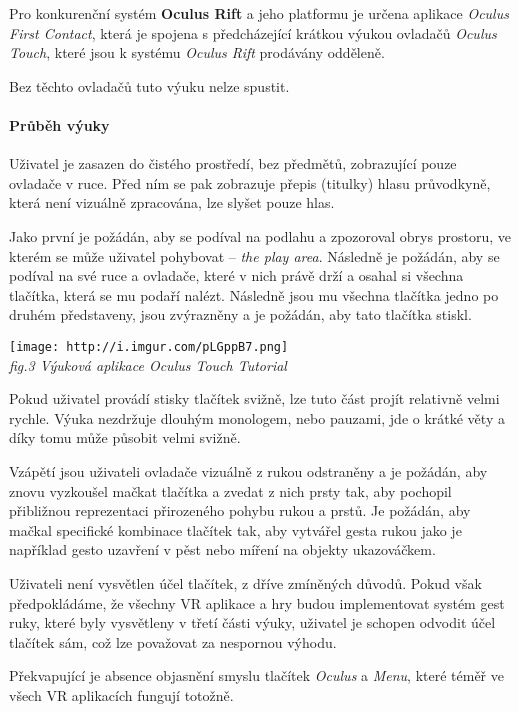 Pro konkurenční systém \textbf{Oculus Rift} a jeho platformu je určena
aplikace \emph{Oculus First Contact}, která je spojena s předcházející
krátkou výukou ovladačů \emph{Oculus Touch}, které jsou k systému
\emph{Oculus Rift} prodávány odděleně.

Bez těchto ovladačů tuto výuku nelze spustit.

\paragraph{Průběh výuky}\label{prux16fbux11bh-vuxfduky-1}

Uživatel je zasazen do čistého prostředí, bez předmětů, zobrazující
pouze ovladače v ruce. Před ním se pak zobrazuje přepis (titulky) hlasu
průvodkyně, která není vizuálně zpracována, lze slyšet pouze hlas.

Jako první je požádán, aby se podíval na podlahu a zpozoroval obrys
prostoru, ve kterém se může uživatel pohybovat -- \emph{the play area}.
Následně je požádán, aby se podíval na své ruce a ovladače, které v nich
právě drží a osahal si všechna tlačítka, která se mu podaří nalézt.
Následně jsou mu všechna tlačítka jedno po druhém představeny, jsou
zvýrazněny a je požádán, aby tato tlačítka stiskl.

\texttt{[image: http://i.imgur.com/pLGppB7.png]}\\
\emph{fig.3 Výuková aplikace Oculus Touch Tutorial}

Pokud uživatel provádí stisky tlačítek svižně, lze tuto část projít
relativně velmi rychle. Výuka nezdržuje dlouhým monologem, nebo pauzami,
jde o krátké věty a díky tomu může působit velmi svižně.

Vzápětí jsou uživateli ovladače vizuálně z rukou odstraněny a je
požádán, aby znovu vyzkoušel mačkat tlačítka a zvedat z nich prsty tak,
aby pochopil přibližnou reprezentaci přirozeného pohybu rukou a prstů.
Je požádán, aby mačkal specifické kombinace tlačítek tak, aby vytvářel
gesta rukou jako je například gesto uzavření v pěst nebo míření na
objekty ukazováčkem.

Uživateli není vysvětlen účel tlačítek, z dříve zmíněných důvodů. Pokud
však předpokládáme, že všechny VR aplikace a hry budou implementovat
systém gest ruky, které byly vysvětleny v třetí části výuky, uživatel je
schopen odvodit účel tlačítek sám, což lze považovat za nespornou
výhodu.

Překvapující je absence objasnění smyslu tlačítek \emph{Oculus} a
\emph{Menu}, které téměř ve všech VR aplikacích fungují totožně.

